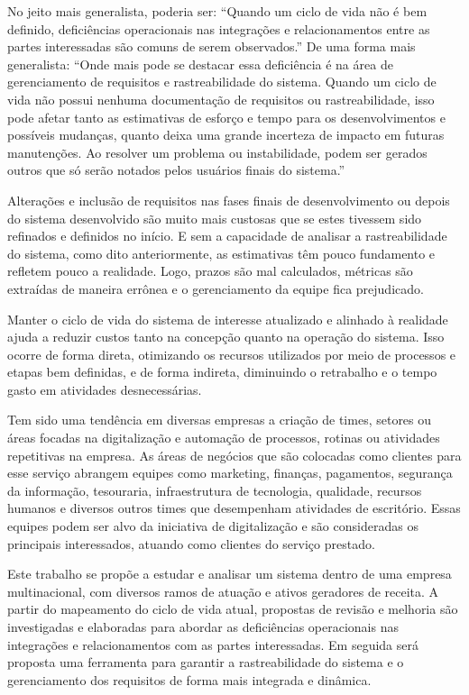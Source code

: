 	{\color{green} No jeito mais generalista, poderia ser: ``Quando um ciclo de vida não é bem definido, deficiências operacionais nas integrações e relacionamentos entre as partes interessadas são comuns de serem observados.''}
	{\color{green} De uma forma mais generalista: ``Onde mais pode se destacar essa deficiência é na área de gerenciamento de requisitos e rastreabilidade do sistema. Quando um ciclo de vida não possui nenhuma documentação de requisitos ou rastreabilidade, isso pode afetar tanto as estimativas de esforço e tempo para os desenvolvimentos e possíveis mudanças, quanto deixa uma grande incerteza de impacto em futuras manutenções. Ao resolver um problema ou instabilidade, podem ser gerados outros que só serão notados pelos usuários finais do sistema.''}

	Alterações e inclusão de requisitos nas fases finais de desenvolvimento ou depois 
	do sistema desenvolvido são muito mais custosas que se estes tivessem sido 
	refinados e definidos no início. E sem a capacidade de analisar a rastreabilidade do 
	sistema, como dito anteriormente, as estimativas têm pouco fundamento e 
	refletem pouco a realidade. Logo, prazos são mal calculados, métricas são extraídas 
	de maneira errônea e o gerenciamento da equipe fica prejudicado. 

	Manter o ciclo de vida do sistema de interesse atualizado e alinhado à realidade 
	ajuda a reduzir custos tanto na concepção quanto na operação do sistema. Isso ocorre 
	de forma direta, otimizando os recursos utilizados por meio de processos e etapas bem 
	definidas, e de forma indireta, diminuindo o retrabalho e o tempo gasto em atividades desnecessárias.

	Tem sido uma tendência em diversas empresas a criação de times, setores ou áreas focadas na digitalização 
	e automação de processos, rotinas ou atividades repetitivas na empresa.
	As áreas de negócios {\color{blue}que são colocadas como clientes para esse serviço} abrangem equipes 
	como marketing, finanças, pagamentos, segurança da informação, tesouraria, infraestrutura de tecnologia, 
	qualidade, recursos humanos e diversos outros times que desempenham atividades de escritório. Essas equipes 
	podem ser alvo da iniciativa de digitalização e são consideradas os principais interessados, atuando como 
	clientes do serviço prestado.

	Este trabalho se propõe a estudar e analisar um sistema dentro de uma empresa multinacional, com 
	diversos ramos de atuação e ativos geradores de receita. A partir do mapeamento do ciclo de vida 
	atual, propostas de revisão e melhoria são investigadas e elaboradas para abordar as deficiências 
	operacionais nas integrações e relacionamentos com as partes interessadas. Em seguida será proposta 
	uma ferramenta para garantir a rastreabilidade do sistema e o gerenciamento dos requisitos de forma 
	mais integrada e dinâmica.
	
